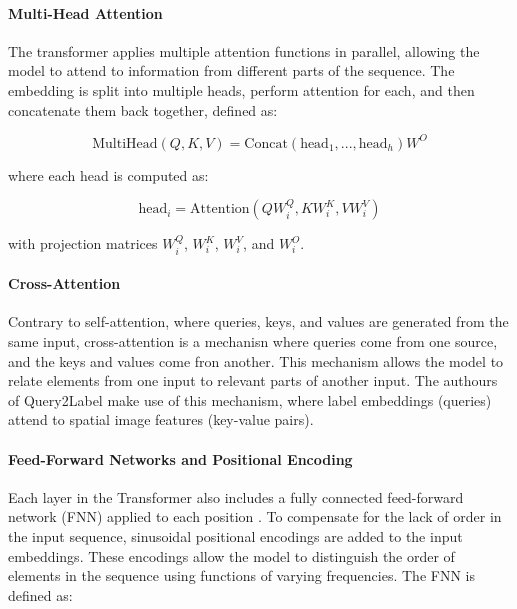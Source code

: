 \documentclass[lettersize,journal]{IEEEtran}
\begin{document}
\paragraph{Multi-Head Attention}
The transformer applies multiple attention functions in parallel, allowing the model to attend to information from different parts of the sequence. The embedding is split into multiple heads, perform attention for each, and then concatenate them back together, defined as:

\begin{equation}
    \label{eq:multihead}
    \text{MultiHead}(Q,K,V) = \text{Concat}(\text{head}_1, ..., \text{head}_h)W^O
\end{equation}
    
\noindent where each head is computed as:

\begin{equation}
    \text{head}_i = \text{Attention}(QW^Q_i, KW^K_i, VW^V_i)
\end{equation}

\noindent with projection matrices $W_i^Q$, $W_i^K$, $W_i^V$, and $W_i^O$.

\paragraph{Cross-Attention}
Contrary to self-attention, where queries, keys, and values are generated from the same input, cross-attention is a mechanisn where queries come from one source, and the keys and values come fron another. This mechanism allows the model to relate elements from one input to relevant parts of another input. The authours of Query2Label \cite{Query2Label} make use of this mechanism, where label embeddings (queries) attend to spatial image features (key-value pairs).



\paragraph{Feed-Forward Networks and Positional Encoding}
Each layer in the Transformer also includes a fully connected feed-forward network (FNN) applied to each position \cite{vaswani2023attentionneed}. To compensate for the lack of order in the input sequence, sinusoidal positional encodings are added to the input embeddings. These encodings allow the model to distinguish the order of elements in the sequence using functions of varying frequencies. The FNN is defined as:
\end{document}
